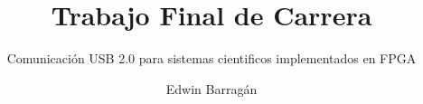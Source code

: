 \author[E. Barragán]{Edwin Barragán}
\title{Trabajo Final de Carrera}
\subtitle{Comunicación USB 2.0 para sistemas cientificos implementados en FPGA}

